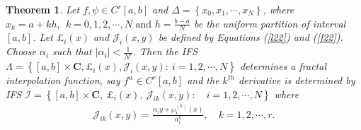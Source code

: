 \documentclass{article}[12pt, a4]
\newtheorem{theorem}{\large Theorem}[section]
\begin{document}
	\begin{theorem}
		Let $f, \psi\in C^{r}[a,b]$ and  $\Delta=\left\{x_0,x_1,\cdots, x_N\right \}$, where $x_k=a+kh,~~ k=0,1,2,\cdots,N \text{ and } h=\frac{b-a}{N}$ be the uniform partition of interval $[a,b]$. Let $\pounds_i(x)$ and $\mathcal{J}_{i}(x,y)$ be defined by Equations (\ref{l22}) and (\ref{f22}). Choose $\alpha_{i}$ such that $|\alpha_{i}| <\frac{1}{N^r}$. Then the IFS $\Lambda=\left\{[a,b]\times \mathbf{C},
		\pounds_i(x),\mathcal{J}_{i}(x,y):~i =1,2,\cdots,N\right\}$ determines a fractal interpolation function, say $f^\alpha \in C^r[a,b]$ and the $k^{th}$ derivative is determined by IFS  $\mathcal{I}=\left\{[a,b]\times \mathbf{C},~
		\pounds_i(x),~ \mathcal{J}_{ik}(x,y): \quad i =1,2,\cdots,N\right\}$ where
		\begin{align*}  
			\mathcal{J}_{i k}(x, y) = \frac{\alpha_i y + \wp_{i}^{(k)}(x)}{a_i^k}, \quad k=1,2,\cdots,r. 
		\end{align*}  
	\end{theorem}
\end{document}
